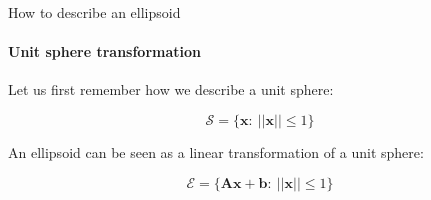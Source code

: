 \documentclass{beamer}
\begin{document}
%
%
%
%
%
%
%
%
%
%
%
%
%
%




\begin{frame}{How to describe an ellipsoid}
\framesubtitle{Unit sphere transformation}
\begin{flushleft}

Let us first remember how we describe a unit sphere:

\begin{equation}
    \mathcal{S} = \{ \mathbf{x}: \ || \mathbf{x} || \leq 1 \}
\end{equation}

An ellipsoid can be seen as a linear transformation of a unit sphere: 

\begin{equation}
    \mathcal{E} = \{ \mathbf{A}\mathbf{x} + \mathbf{b}: \ || \mathbf{x} || \leq 1 \}
\end{equation}
 
\end{flushleft}
\end{frame}
\end{document}
